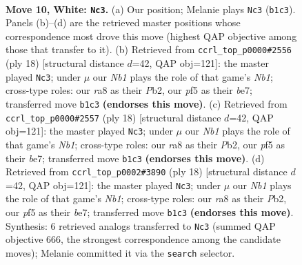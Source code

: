 \documentclass[11pt]{article}
\begin{document}
\clearpage

\begin{figure}[p]\centering
\begin{subfigure}{0.46\textwidth}\centering
\resizebox{\linewidth}{!}{%
\newchessgame
\chessboard[
  setfen={r1b1kb1r/ppp3p1/2n5/3q1p1p/3Pn3/3B1N2/PP3PPP/RNBQ1RK1 w kq - 0 10},
  showmover=false,
  pgfstyle=straightmove, color=movearrow, markmove={b1-c3}
]}
\caption{}
\end{subfigure}\hfill
\begin{subfigure}{0.46\textwidth}\centering
\resizebox{\linewidth}{!}{%
\newchessgame
\chessboard[
  setfen={r1b2rk1/ppp1bppp/2n5/3q4/3Pn3/3B1N2/PP3PPP/RNBQ1RK1 w - - 0 10},
  showmover=false,
  pgfstyle=straightmove, color=movearrow, markmove={b1-c3}
]}
\caption{}
\end{subfigure}
\\[4pt]
\begin{subfigure}{0.46\textwidth}\centering
\resizebox{\linewidth}{!}{%
\newchessgame
\chessboard[
  setfen={r1b2rk1/ppp1bppp/2n5/3q4/3Pn3/3B1N2/PP3PPP/RNBQ1RK1 w - - 0 10},
  showmover=false,
  pgfstyle=straightmove, color=movearrow, markmove={b1-c3}
]}
\caption{}
\end{subfigure}\hfill
\begin{subfigure}{0.46\textwidth}\centering
\resizebox{\linewidth}{!}{%
\newchessgame
\chessboard[
  setfen={r1b2rk1/ppp1bppp/2n5/3q4/3Pn3/3B1N2/PP3PPP/RNBQ1RK1 w - - 0 10},
  showmover=false,
  pgfstyle=straightmove, color=movearrow, markmove={b1-c3}
]}
\caption{}
\end{subfigure}
\caption{\textbf{Move 10, White: \texttt{Nc3}.} (a) Our position; Melanie plays \texttt{Nc3} (\texttt{b1c3}). Panels (b)--(d) are the retrieved master positions whose correspondence most drove this move (highest QAP objective among those that transfer to it). (b) Retrieved from \texttt{ccrl\_top\_p0000\#2556} (ply 18) [structural distance $d$=42, QAP obj=121]: the master played \texttt{Nc3}; under $\mu$ our \emph{Nb1} plays the role of that game's \emph{Nb1}; cross-type roles: our \emph{r}a8 as their \emph{P}b2, our \emph{p}f5 as their \emph{b}e7; transferred move \texttt{b1c3} \textbf{(endorses this move)}. (c) Retrieved from \texttt{ccrl\_top\_p0000\#2557} (ply 18) [structural distance $d$=42, QAP obj=121]: the master played \texttt{Nc3}; under $\mu$ our \emph{Nb1} plays the role of that game's \emph{Nb1}; cross-type roles: our \emph{r}a8 as their \emph{P}b2, our \emph{p}f5 as their \emph{b}e7; transferred move \texttt{b1c3} \textbf{(endorses this move)}. (d) Retrieved from \texttt{ccrl\_top\_p0002\#3890} (ply 18) [structural distance $d$=42, QAP obj=121]: the master played \texttt{Nc3}; under $\mu$ our \emph{Nb1} plays the role of that game's \emph{Nb1}; cross-type roles: our \emph{r}a8 as their \emph{P}b2, our \emph{p}f5 as their \emph{b}e7; transferred move \texttt{b1c3} \textbf{(endorses this move)}. Synthesis: 6 retrieved analogs transferred to \texttt{Nc3} (summed QAP objective 666, the strongest correspondence among the candidate moves); Melanie committed it via the \texttt{search} selector.}
\label{fig:thought-m18}
\end{figure}
\end{document}
